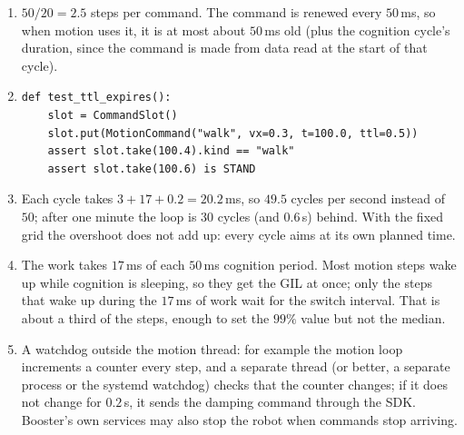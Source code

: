\begin{enumerate}[label=\textbf{\ansnum.\arabic*}]
  \item $50/20=2.5$ steps per command. The command is renewed every $50$\,ms, so when motion uses it, it is at most about $50$\,ms old (plus the cognition cycle's duration, since the command is made from data read at the start of that cycle).
  \item
\begin{verbatim}
def test_ttl_expires():
    slot = CommandSlot()
    slot.put(MotionCommand("walk", vx=0.3, t=100.0, ttl=0.5))
    assert slot.take(100.4).kind == "walk"
    assert slot.take(100.6) is STAND
\end{verbatim}
  \item Each cycle takes $3+17+0.2=20.2$\,ms, so $49.5$ cycles per second instead of $50$; after one minute the loop is $30$ cycles (and $0.6$\,s) behind. With the fixed grid the overshoot does not add up: every cycle aims at its own planned time.
  \item The work takes $17$\,ms of each $50$\,ms cognition period. Most motion steps wake up while cognition is sleeping, so they get the GIL at once; only the steps that wake up during the $17$\,ms of work wait for the switch interval. That is about a third of the steps, enough to set the $99\%$ value but not the median.
  \item A watchdog outside the motion thread: for example the motion loop increments a counter every step, and a separate thread (or better, a separate process or the systemd watchdog) checks that the counter changes; if it does not change for $0.2$\,s, it sends the damping command through the SDK. Booster's own services may also stop the robot when commands stop arriving\guess.
\end{enumerate}
